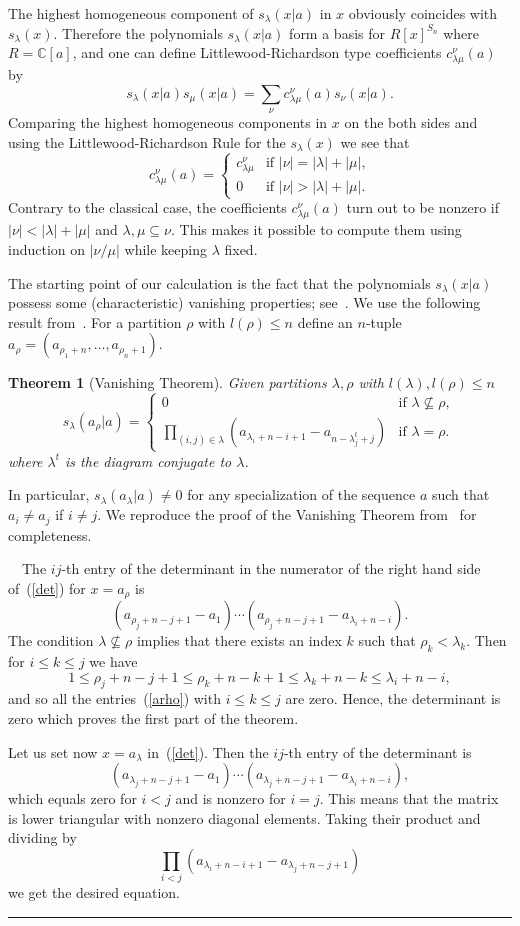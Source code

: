 \documentclass[titlepage,12pt]{article}
\newcommand{\bth}{\begin{thm}}
\renewcommand{\eth}{\end{thm}}
\newcommand{\barr}{\begin{array}}
\newcommand{\earr}{\end{array}}
\newcommand{\beq}{\begin{equation}}
\newcommand{\eeq}{\end{equation}}
\newcommand{\qed}{\rule{1ex}{1ex}}
\newcommand{\case}[4]{\left\{\barr{ll}#1&\mbox{#2}\\#3&\mbox{#4}\earr\right.
}
\newcommand{\la}{\lambda}
\newcommand{\0}{{\bf 0}}
\newcommand{\1}{{\bf 1}}
\newcommand{\2}{{\bf 2}}
\newcommand{\3}{{\bf 3}}
\newcommand{\4}{{\bf 4}}
\newcommand{\5}{{\bf 5}}
\newcommand{\6}{{\bf 6}}
\newcommand{\7}{{\bf 7}}
\newcommand{\8}{{\bf 8}}
\newcommand{\9}{{\bf 9}}
\newcommand{\Proof}{\noindent{\bf Proof.}\ \ }
\newtheorem{thm}{Theorem}[section]
\begin{document}
The highest homogeneous component of $s_{\lambda}(x|a)$ in $x$ 
obviously coincides with $s_{\lambda}(x)$. Therefore
the polynomials $s_{\lambda}(x|a)$ form a basis for
$R[x]^{S_n}$ where $R=\mathbb C[a]$, and one can define
Littlewood-Richardson type coefficients $c_{\lambda\mu}^{\nu}(a)$ by
\beq
s_{\lambda}(x|a)s_{\mu}(x|a)=
\sum_{\nu} c_{\lambda\mu}^{\nu}(a) s_{\nu}(x|a). \label{FLR}
\eeq
Comparing the highest homogeneous components in $x$ on the both sides
and using the Littlewood-Richardson Rule for the $s_\la(x)$ we see that 
\beq						\label{high}
c_{\lambda\mu}^{\nu}(a)=
\case{c_{\lambda\mu}^{\nu}}{if $|\nu|=|\lambda|+|\mu|$,}
{0}{if $|\nu|>|\lambda|+|\mu|$.}
\eeq
Contrary to the classical case, the coefficients $c_{\lambda\mu}^{\nu}(a)$
turn out to be nonzero if $|\nu|<|\lambda|+|\mu|$ and
$\lambda,\mu\subseteq\nu$. This makes it possible to compute them using
induction on $|\nu/\mu|$ while keeping $\lambda$ fixed.

The starting point of our calculation is the fact that the polynomials
$s_{\lambda}(x|a)$ possess some (characteristic) vanishing properties;
see~\cite{sah:sci,oko:qih}. We use the following result
from~\cite{oko:qih}.
For a partition $\rho$ with $l(\rho)\leq n$ define an $n$-tuple
$a_{\rho}=(a_{\rho_1+n},\dots,a_{\rho_n+1})$.

\bth[Vanishing Theorem]			\label{VT}
Given partitions $\la,\rho$ with $l(\la),l(\rho)\leq n$
$$
s_{\lambda}(a_{\rho}|a)=
\case{0}{if $\lambda\not\subseteq\rho,$}
{\prod_{(i,j)\in\lambda}(a_{\lambda_i+n-i+1}-a_{n-\lambda^t_j+j})}
{if $\la=\rho$.}
$$
where $\lambda^t$ is the diagram conjugate to $\lambda$.
\eth

In particular, $s_{\lambda}(a_{\lambda}|a)\ne 0$ for any
specialization of the sequence $a$ such that $a_i\ne a_j$ if $i\ne j$. 
We reproduce the proof of the Vanishing Theorem from~\cite{oko:qih}
for completeness. 
\bigskip

\Proof The $ij$-th entry of the determinant
in the numerator of the right hand side of~(\ref{det})
for $x=a_{\rho}$ is
\beq				\label{arho}
(a_{\rho_j+n-j+1}-a_1)\cdots
(a_{\rho_j+n-j+1}-a_{\lambda_i+n-i}).
\eeq
The condition $\lambda\not\subseteq\rho$ implies that there exists
an index $k$ such that
$\rho_k<\lambda_k$. Then for $i \leq k\leq j$ we have
$$
1\leq \rho_j+n-j+1\leq \rho_k+n-k+1\leq
\lambda_k+n-k\leq \lambda_i+n-i,
$$
and so all the entries~(\ref{arho}) with $i \leq k\leq j$ are zero. Hence,
the determinant is zero which proves the first part of the theorem.

Let us set now $x=a_{\lambda}$ in~(\ref{det}). Then the $ij$-th entry of
the determinant is
$$
(a_{\lambda_j+n-j+1}-a_1)\cdots (a_{\lambda_j+n-j+1}-a_{\lambda_i+n-i}),
$$
which equals zero for $i<j$ and is nonzero for $i=j$. This means that
the matrix is lower triangular with nonzero diagonal elements.
Taking their product and dividing by 
$$
\prod_{i<j}(a_{\lambda_i+n-i+1}-a_{\lambda_j+n-j+1})
$$
we get  the  desired equation. \hfill\qed
\end{document}

